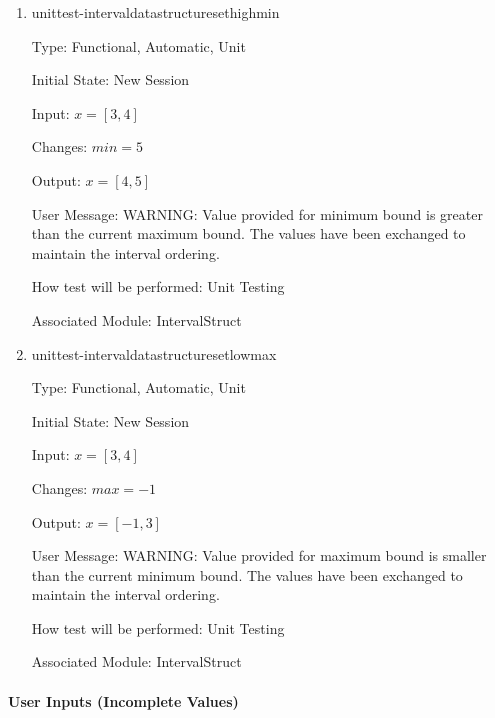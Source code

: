 \documentclass[12pt, titlepage]{article}
\begin{document}
\begin{enumerate}
	\item{unittest-intervaldatastructuresethighmin}
	
	Type: Functional, Automatic, Unit
	
	Initial State: New Session
	
	Input: $x = [3,4]$
	
	Changes: $min = 5$
	
	Output: $x = [4,5]$
	
	User Message: WARNING: Value provided for minimum bound is greater than the 
	current maximum bound. The values have been exchanged to maintain the 
	interval ordering.
	
	How test will be performed: Unit Testing
	
	Associated Module: IntervalStruct\\
	
	\item{unittest-intervaldatastructuresetlowmax}
	
	Type: Functional, Automatic, Unit
	
	Initial State: New Session
	
	Input: $x = [3,4]$
	
	Changes: $max = -1$
	
	Output: $x = [-1,3]$
	
	User Message: WARNING: Value provided for maximum bound is smaller than the 
	current minimum bound. The values have been exchanged to maintain the 
	interval ordering.
	
	How test will be performed: Unit Testing
	
	Associated Module: IntervalStruct\\
\end{enumerate}

\paragraph{User Inputs (Incomplete Values)}
\end{document}

